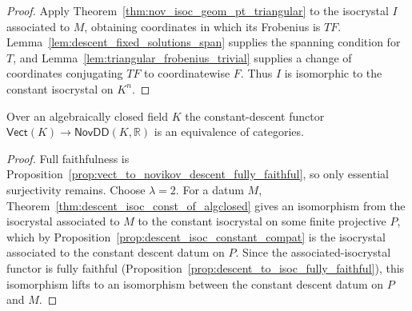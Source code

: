 \begin{proof}
  \leanok
  Apply Theorem~\ref{thm:nov_isoc_geom_pt_triangular} to the isocrystal $I$
  associated to $M$, obtaining coordinates in which its Frobenius is $TF$.
  Lemma~\ref{lem:descent_fixed_solutions_span} supplies the spanning condition
  for $T$, and Lemma~\ref{lem:triangular_frobenius_trivial} supplies a change of
  coordinates conjugating $TF$ to coordinatewise $F$.  Thus $I$ is isomorphic
  to the constant isocrystal on $K^n$.
\end{proof}

\begin{theorem}
  \label{thm:novikov_descent_equivalence_algclosed}
  \leanok
  Over an algebraically closed field $K$ the constant-descent functor
  $\mathsf{Vect}(K) \to \mathsf{NovDD}(K, \mathbb{R})$ is an equivalence of
  categories.
\end{theorem}

\begin{proof}
  \leanok
  Full faithfulness is
  Proposition~\ref{prop:vect_to_novikov_descent_fully_faithful}, so only
  essential surjectivity remains.  Choose $\lambda=2$.  For a datum $M$,
  Theorem~\ref{thm:descent_isoc_const_of_algclosed} gives an isomorphism from
  the isocrystal associated to $M$ to the constant isocrystal on some finite
  projective $P$, which by Proposition~\ref{prop:descent_isoc_constant_compat}
  is the isocrystal associated to the constant descent datum on $P$.  Since the
  associated-isocrystal functor is fully faithful
  (Proposition~\ref{prop:descent_to_isoc_fully_faithful}), this isomorphism
  lifts to an isomorphism between the constant descent datum on $P$ and $M$.
\end{proof}
